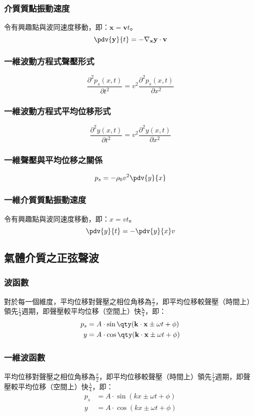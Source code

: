 \documentclass[a4paper,12pt]{report}
\begin{document}
\subsubsection{介質質點振動速度}
令有興趣點與波同速度移動，即：$\mathbf{x}=\mathbf{v}t$。
\[\pdv{\mathbf{y}}{t} = - \nabla_{\mathbf{x}} \mathbf{y} \cdot \mathbf{v}\]
\subsubsection {一維波動方程式聲壓形式}
\[\frac{\partial^2 p_s(x, t)}{\partial t^2} = v^2 \frac{\partial^2 p_s(x, t)}{\partial x^2}\]
\subsubsection {一維波動方程式平均位移形式}
\[\frac{\partial^2 y(x, t)}{\partial t^2} = v^2 \frac{\partial^2 y(x, t)}{\partial x^2}\]
\subsubsection {一維聲壓與平均位移之關係}
\[p_s = -\rho_0 v^2 \pdv{y}{x}\]
\subsubsection{一維介質質點振動速度}
令有興趣點與波同速度移動，即：$x=vt$。
\[ \pdv{y}{t}=-\pdv{y}{x}v \]
\subsection {氣體介質之正弦聲波}
\subsubsection{波函數}
對於每一個維度，平均位移對聲壓之相位角移為$\frac{\pi}{2}$，即平均位移較聲壓（時間上）領先$\frac{1}{4}$週期，即聲壓較平均位移（空間上）快$\frac{\mathbf{\lambda}}{4}$，即：
\[\begin{aligned}
p_s &= A \cdot \sin\qty(\mathbf{k} \cdot \mathbf{x} \pm \omega t + \phi) \\
y &= A \cdot \cos\qty(\mathbf{k} \cdot \mathbf{x} \pm \omega t + \phi) 
\end{aligned}\]
\subsubsection{一維波函數}
平均位移對聲壓之相位角移為$\frac{\pi}{2}$，即平均位移較聲壓（時間上）領先$\frac{1}{4}$週期，即聲壓較平均位移（空間上）快$\frac{\lambda}{4}$，即：
\[\begin{aligned}
p_s &=A\cdot\sin(kx\pm\omega t+\phi)\\
y &=A\cdot\cos(kx\pm\omega t+\phi)
\end{aligned}\]
\end{document}

